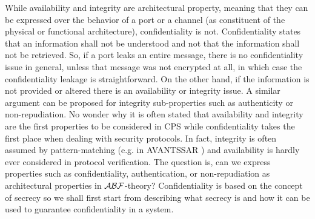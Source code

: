 While availability and integrity are architectural property, meaning that they
can be expressed over the behavior of a port or a channel (as constituent of
the physical or functional architecture), confidentiality is not.
Confidentiality states that an information shall not be understood and not that
the information shall not be retrieved. So, if a port leaks an entire message,
there is no confidentiality issue in general, unless that message was not
encrypted at all, in which case the confidentiality leakage is straightforward. 
On the other hand, if the
information is not provided or altered there is an availability or integrity
issue. A similar argument can be proposed for integrity sub-properties such as
authenticity or non-repudiation. No wonder why it is often stated that
availability and integrity are the first properties to be considered in CPS
while confidentiality takes the first place when dealing with security
protocols. In fact, integrity is often assumed by pattern-matching (e.g. in
AVANTSSAR \autocite{avantssar}) and availability is hardly ever considered in
protocol verification. The question is, can we express properties such as
confidentiality, authentication, or non-repudiation as architectural properties
in $\mathcal{A}\mathcal{B}\mathcal{F}$-theory? Confidentiality is based on the concept 
of secrecy so we shall first start from describing what secrecy is and how it
can be used to guarantee confidentiality in a system.

